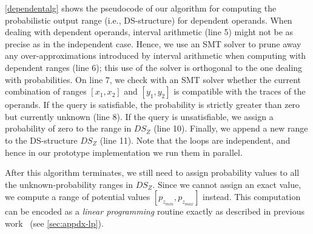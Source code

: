 \cref{dependentalg} shows the pseudocode of our algorithm for computing the
probabilistic output range (i.e., DS-structure) for dependent operands.
%
When dealing with dependent operands, interval arithmetic (line 5) might not be as precise as in the independent case.
%
Hence, we use an SMT solver to prune away any over-approximations introduced by
interval arithmetic when computing with dependent ranges (line 6);
this use of the solver is orthogonal to the one dealing with probabilities.
%
On line 7, we check with an SMT solver whether the current combination of
ranges $[x_1, x_2]$ and $[y_1, y_2]$ is compatible with the traces of the
operands.
%
If the query is satisfiable, the probability is strictly greater than zero but currently unknown (line 8).
%
If the query is unsatisfiable, we assign a probability of zero to the range in $DS_Z$ (line 10). 
%
%
%
%
Finally, we append a new range to the DS-structure $DS_Z$ (line 11).
%
Note that the loops are independent, and hence in our prototype implementation we run them in parallel.


After this algorithm terminates, we still need to assign probability values to
all the unknown-probability ranges in $DS_Z$.
%
Since we cannot assign an exact value, we compute a range of potential values
$[p_{z_{min}}, p_{z_{max}}]$ instead. 
%
This computation can be encoded as a \emph{linear programming} routine exactly
as described in previous work~\cite{bouissou2012generalization} (see \cref{sec:appdx-lp}).


%


